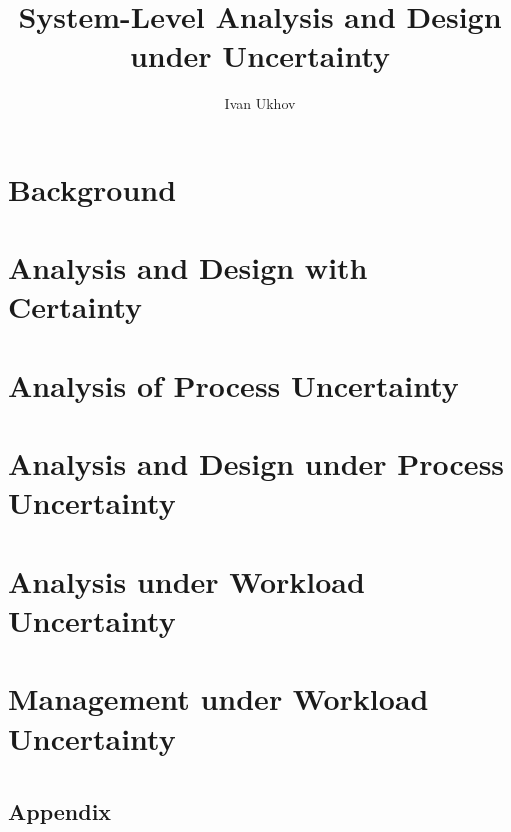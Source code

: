 \documentclass{thesis}
\title{System-Level Analysis and Design under Uncertainty}
\author{Ivan Ukhov}
\begin{document}
\chapter{\introductiontitle}
\glsresetall
\newcommand{\inputsection}[1]{}


\chapter{Background}
\glsresetall
\renewcommand{\inputsection}[1]{}


\chapter{Analysis and Design with Certainty}
\glsresetall
\renewcommand{\inputsection}[1]{}


\chapter{Analysis of Process Uncertainty}
\glsresetall
\renewcommand{\inputsection}[1]{}


\chapter{Analysis and Design under Process Uncertainty}
\glsresetall
\renewcommand{\inputsection}[1]{}


\chapter{Analysis under Workload Uncertainty}
\glsresetall
\renewcommand{\inputsection}[1]{}


\chapter{Management under Workload Uncertainty}
\glsresetall
\renewcommand{\inputsection}[1]{}


\chapter{\conclusiontitle}
\glsresetall


\begin{appendices}
\chapter{Appendix}
\glsresetall
\renewcommand{\inputsection}[1]{}

\end{appendices}

\printbibliography
\end{document}
